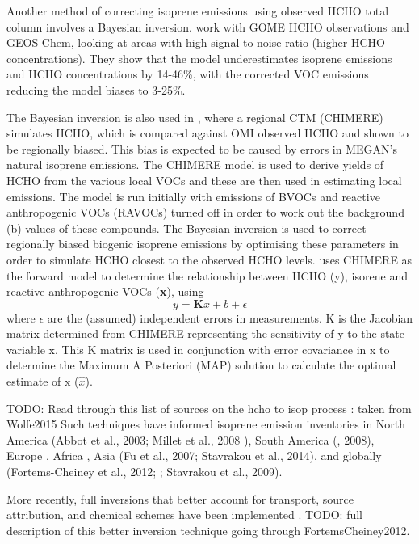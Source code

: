 	    Another method of correcting isoprene emissions using observed HCHO total column involves a Bayesian inversion.
	    \citet{Shim2005} work with GOME HCHO observations and GEOS-Chem, looking at areas with high signal to noise ratio (higher HCHO concentrations).
	    They show that the model underestimates isoprene emissions and HCHO concentrations by 14-46\%, with the corrected VOC emissions reducing the model biases to 3-25\%.
	    
	    The Bayesian inversion is also used in \citet{Curci2010}, where a regional CTM (CHIMERE) simulates HCHO, which is compared against OMI observed HCHO and shown to be regionally biased.
	    This bias is expected to be caused by errors in MEGAN's natural isoprene emissions.
	    The CHIMERE model is used to derive yields of HCHO from the various local VOCs and these are then used in estimating local emissions.
	    The model is run initially with emissions of BVOCs and reactive anthropogenic VOCs (RAVOCs) turned off in order to work out the background (b) values of these compounds.
	    The Bayesian inversion is used to correct regionally biased biogenic isoprene emissions by optimising these parameters in order to simulate HCHO closest to the observed HCHO levels.
	    \cite{Curci2010} uses CHIMERE as the forward model to determine the relationship between HCHO (y), isorene and reactive anthropogenic VOCs (\textbf{x}), using 
	    \begin{equation}
	        y=\mathbf{K}x + b + \epsilon
	    \end{equation}
	    where $\epsilon$ are the (assumed) independent errors in measurements.
	    K is the Jacobian matrix determined from CHIMERE representing the sensitivity of y to the state variable x.
	    This K matrix is used in conjunction with error covariance in x to determine the Maximum A Posteriori (MAP) solution to calculate the optimal estimate of x ($\hat{x}$).
	    
	    TODO: Read through this list of sources on the hcho to isop process : taken from Wolfe2015
	    Such techniques have informed isoprene emission inventories in North America (Abbot et al., 2003; Millet et al., 2008 \citep{Palmer2003,Millet2006,Palmer2006}), South America (\citep{Barkley2013}, 2008), Europe \citep{Curci2010,Dufour2009}, Africa \citep{Marais2012}, Asia (Fu et al., 2007; Stavrakou et al., 2014), and globally (Fortems-Cheiney et al., 2012; \citep{Shim2005}; Stavrakou et al., 2009).
	    
	    More recently, full inversions that better account for transport, source attribution, and chemical schemes have been implemented \citep{FortemsCheiney2012}.
	    TODO: full description of this better inversion technique going through FortemsCheiney2012.
	    
